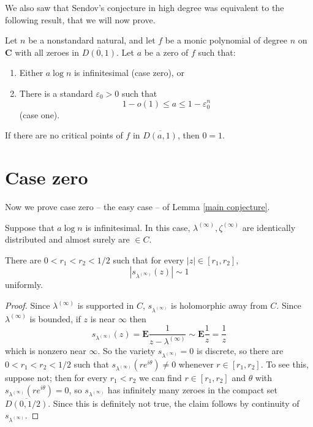 \documentclass[12pt]{article}
\begin{document}
We also saw that Sendov's conjecture in high degree was equivalent to the following result, that we will now prove.
\begin{lemma}
\label{main conjecture}
Let $n$ be a nonstandard natural, and let $f$ be a monic polynomial of degree $n$ on $\mathbf C$ with all zeroes in $\overline{D(0, 1)}$.
Let $a$ be a zero of $f$ such that:
\begin{enumerate}
\item Either $a \log n$ is infinitesimal (case zero), or
\item There is a standard $\varepsilon_0 > 0$ such that
$$1 - o(1) \leq a \leq 1 - \varepsilon_0^n$$
(case one).
\end{enumerate}
If there are no critical points of $f$ in $\overline{D(a, 1)}$, then $0 = 1$.
\end{lemma}

\section{Case zero}
Now we prove case zero -- the easy case -- of Lemma \ref{main conjecture}.

Suppose that $a \log n$ is infinitesimal.
In this case, $\lambda^{(\infty)}, \zeta^{(\infty)}$ are identically distributed and almost surely are $\in C$.

\begin{lemma}
There are $0 < r_1 < r_2 < 1/2$ such that for every $|z| \in [r_1, r_2]$,
$$|s_{\lambda^{(\infty)}}(z)| \sim 1$$
uniformly.
\end{lemma}
\begin{proof}
Since $\lambda^{(\infty)}$ is supported in $C$, $s_{\lambda^{(\infty)}}$ is holomorphic away from $C$.
Since $\lambda^{(\infty)}$ is bounded, if $z$ is near $\infty$ then
$$s_{\lambda^{(\infty)}}(z) = \mathbf E\frac{1}{z - \lambda^{(\infty)}} \sim \mathbf E \frac{1}{z} = \frac{1}{z}$$
which is nonzero near $\infty$.
So the variety $s_{\lambda^{(\infty)}} = 0$ is discrete, so there are $0 < r_1 < r_2 < 1/2$ such that $s_{\lambda^{(\infty)}}(re^{i\theta}) \neq 0$ whenever $r \in [r_1, r_2]$.
To see this, suppose not; then for every $r_1 < r_2$ we can find $r \in [r_1, r_2]$ and $\theta$ with $s_{\lambda^{(\infty)}}(re^{i\theta}) = 0$, so $s_{\lambda^{(\infty)}}$ has infinitely many zeroes in the compact set $\overline{D(0, 1/2)}$.
Since this is definitely not true, the claim follows by continuity of $s_{\lambda^{(\infty)}}$.
\end{proof}
\end{document}

